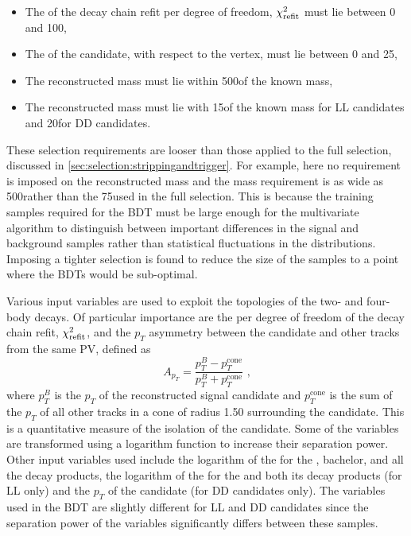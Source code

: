 \begin{itemize}
\item The \chisq of the decay chain refit per degree of freedom, $\chi^2_\text{refit}$ must lie between 0 and 100,
\item The \chisqip of the \Bm candidate, with respect to the \Bm vertex, must lie between 0 and 25,
\item The reconstructed \Kstarm mass must lie within 500\mevcc of the known \Kstarm mass,
\item The reconstructed \KS mass must lie with 15\mevcc of the known \KS mass for LL candidates and 20\mevcc for DD candidates.
\end{itemize}
These selection requirements are looser than those applied to the full selection, discussed in \sect\ref{sec:selection:strippingandtrigger}. For example, here no requirement is imposed on the reconstructed \Dz mass and the \Kstarm mass requirement is as wide as 500\mevcc rather than the 75\mevcc used in the full selection. This is because the training samples required for the BDT must be large enough for the multivariate algorithm to distinguish between important differences in the signal and background samples rather than statistical fluctuations in the distributions. Imposing a tighter selection is found to reduce the size of the samples to a point where the BDTs would be sub-optimal.

Various input variables are used to exploit the topologies of the two- and four-body decays. Of particular importance are the \chisq per degree of freedom of the decay chain refit, $\chi^2_\text{refit}$, and the $p_T$ asymmetry between the \Bm candidate and other tracks from the same PV, defined as
\begin{equation}
A_{p_T} = \frac{p_T^B - p_T^{\text{cone}}}{p_T^B + p_T^{\text{cone}}} \text{ ,}
\label{ptasy}
\end{equation}
where $p_T^B$ is the $p_T$ of the reconstructed \Bm signal candidate and $p_T^{\text{cone}}$ is the sum of the $p_T$ of all other tracks in a cone of radius 1.50 surrounding the \Bm candidate. This is a quantitative measure of the isolation of the \Bm candidate. Some of the variables are transformed using a logarithm function to increase their separation power. Other input variables used include the logarithm of the \chisqip for the \Bm, bachelor, \Dz and all the \Dz decay products, the logarithm of the \chisqip for the \KS and both its decay products (for LL only) and the $p_T$ of the \KS candidate (for DD candidates only). The variables used in the BDT are slightly different for LL and DD candidates since the separation power of the \KS variables significantly differs between these samples. 

